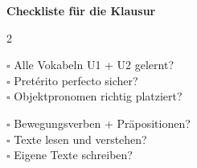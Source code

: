 \documentclass[11pt, a4paper]{article}
\begin{document}
\begin{merkbox}
\textbf{Checkliste für die Klausur}

\vspace{4pt}

\begin{multicols}{2}
{\footnotesize

$\square$ Alle Vokabeln U1 + U2 gelernt?\\
$\square$ Pretérito perfecto sicher?\\
$\square$ Objektpronomen richtig platziert?

\columnbreak

$\square$ Bewegungsverben + Präpositionen?\\
$\square$ Texte lesen und verstehen?\\
$\square$ Eigene Texte schreiben?

}
\end{multicols}
\end{merkbox}
\end{document}
